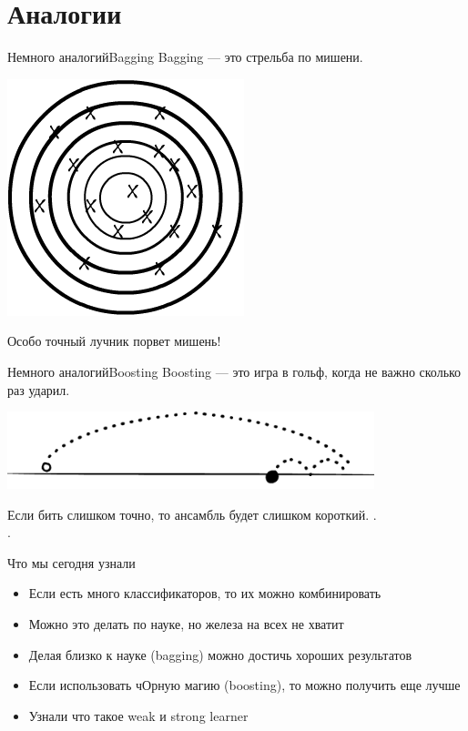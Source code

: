 \documentclass[14pt, fleqn, xcolor={dvipsnames, table}]{beamer}
\begin{document}
\section{Аналогии}

\begin{frame}{Немного аналогий}{Bagging}
Bagging --- это стрельба по мишени.
\begin{center}
\includegraphics[height=0.4\textheight]{mockup_2.png}
\end{center}
Особо точный лучник порвет мишень!  \\
 
\end{frame}

\begin{frame}{Немного аналогий}{Boosting}
Boosting --- это игра в гольф, когда не важно сколько раз ударил.
\begin{center}
\includegraphics[width=0.8\textwidth]{mockup.png}
\end{center}
Если бить слишком точно, то ансамбль будет слишком короткий. .\\
 .
\end{frame}

\begin{frame}{Что мы сегодня узнали}
\begin{itemize}
  \item Если есть много классификаторов, то их можно комбинировать
  \item Можно это делать по науке, но железа на всех не хватит
  \item Делая близко к науке (bagging) можно достичь хороших результатов
  \item Если использовать чОрную магию (boosting), то можно получить еще лучше
  \item Узнали что такое weak и strong learner
\end{itemize}
\end{frame}
\end{document}
